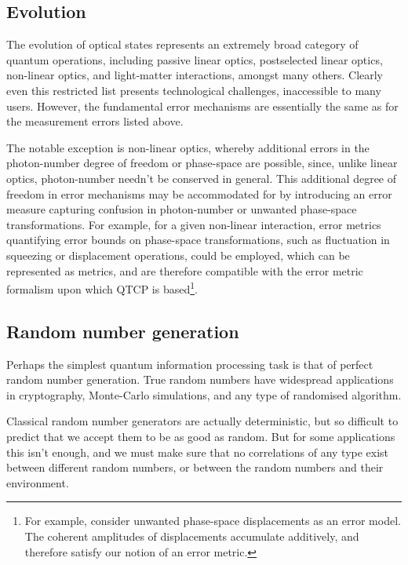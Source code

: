 \documentclass[aps,rmp,twocolumn,amsmath,amssymb,nofootinbib,superscriptaddress,longbibliography,floatfix]{revtex4-1}
\begin{document}
\subsection{Evolution}

The evolution of optical states represents an extremely broad category of quantum operations, including passive linear optics, postselected linear optics, non-linear optics, and light-matter interactions, amongst many others. Clearly even this restricted list presents technological challenges, inaccessible to many users. However, the fundamental error mechanisms are essentially the same as for the measurement errors listed above.

The notable exception is non-linear optics, whereby additional errors in the photon-number degree of freedom or phase-space are possible, since, unlike linear optics, photon-number needn't be conserved in general. This additional degree of freedom in error mechanisms may be accommodated for by introducing an error measure capturing confusion in photon-number or unwanted phase-space transformations. For example, for a given non-linear interaction, error metrics quantifying error bounds on phase-space transformations, such as fluctuation in squeezing or displacement operations, could be employed, which can be represented as metrics, and are therefore compatible with the error metric formalism upon which QTCP is based\footnote{For example, consider unwanted phase-space displacements as an error model. The coherent amplitudes of displacements accumulate additively, and therefore satisfy our notion of an error metric.}.

%
%

\subsection{Random number generation}

Perhaps the simplest quantum information processing task is that of perfect random number generation. True random numbers have widespread applications in cryptography, Monte-Carlo simulations, and any type of randomised algorithm.

Classical random number generators are actually deterministic, but so difficult to predict that we accept them to be as good as random. But for some applications this isn't enough, and we must make sure that no correlations of any type exist between different random numbers, or between the random numbers and their environment.
\end{document}
